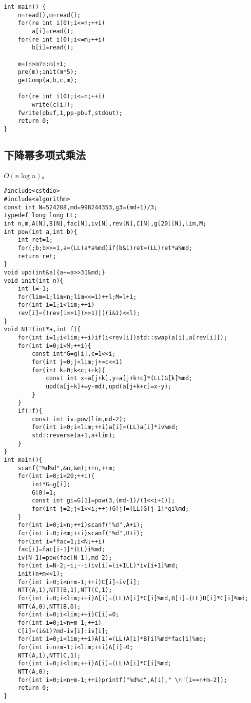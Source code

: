 \documentclass{ctexart}
\begin{document}
\begin{lstlisting}
int main() {
    n=read(),m=read();
    for(re int i(0);i<=n;++i)
        a[i]=read();
    for(re int i(0);i<=m;++i)
        b[i]=read();
    
    m=(n>m?n:m)+1;
    pre(m);init(m*5);
    getComp(a,b,c,m);
    
    for(re int i(0);i<=n;++i)
        write(c[i]);
    fwrite(pbuf,1,pp-pbuf,stdout);
    return 0;
}
\end{lstlisting}

\subsection{下降幂多项式乘法}

$O(n\log n)$。

\begin{lstlisting}
#include<cstdio>
#include<algorithm>
const int N=524288,md=998244353,g3=(md+1)/3;
typedef long long LL;
int n,m,A[N],B[N],fac[N],iv[N],rev[N],C[N],g[20][N],lim,M;
int pow(int a,int b){
    int ret=1;
    for(;b;b>>=1,a=(LL)a*a%md)if(b&1)ret=(LL)ret*a%md;
    return ret;
}
void upd(int&a){a+=a>>31&md;}
void init(int n){
    int l=-1;
    for(lim=1;lim<n;lim<<=1)++l;M=l+1;
    for(int i=1;i<lim;++i)
    rev[i]=((rev[i>>1])>>1)|((i&1)<<l);
}
void NTT(int*a,int f){
    for(int i=1;i<lim;++i)if(i<rev[i])std::swap(a[i],a[rev[i]]);
    for(int i=0;i<M;++i){
        const int*G=g[i],c=1<<i;
        for(int j=0;j<lim;j+=c<<1)
        for(int k=0;k<c;++k){
            const int x=a[j+k],y=a[j+k+c]*(LL)G[k]%md;
            upd(a[j+k]+=y-md),upd(a[j+k+c]=x-y);
        }
    }
    if(!f){
        const int iv=pow(lim,md-2);
        for(int i=0;i<lim;++i)a[i]=(LL)a[i]*iv%md;
        std::reverse(a+1,a+lim);
    }
}
int main(){
    scanf("%d%d",&n,&m);++n,++m;
    for(int i=0;i<20;++i){
        int*G=g[i];
        G[0]=1;
        const int gi=G[1]=pow(3,(md-1)/(1<<i+1));
        for(int j=2;j<1<<i;++j)G[j]=(LL)G[j-1]*gi%md;
    }
    for(int i=0;i<n;++i)scanf("%d",A+i);
    for(int i=0;i<m;++i)scanf("%d",B+i);
    for(int i=*fac=1;i<N;++i)
    fac[i]=fac[i-1]*(LL)i%md;
    iv[N-1]=pow(fac[N-1],md-2);
    for(int i=N-2;~i;--i)iv[i]=(i+1LL)*iv[i+1]%md;
    init(n+m<<1);
    for(int i=0;i<n+m-1;++i)C[i]=iv[i];
    NTT(A,1),NTT(B,1),NTT(C,1);
    for(int i=0;i<lim;++i)A[i]=(LL)A[i]*C[i]%md,B[i]=(LL)B[i]*C[i]%md;
    NTT(A,0),NTT(B,0);
    for(int i=0;i<lim;++i)C[i]=0;
    for(int i=0;i<n+m-1;++i)
    C[i]=(i&1)?md-iv[i]:iv[i];
    for(int i=0;i<lim;++i)A[i]=(LL)A[i]*B[i]%md*fac[i]%md;
    for(int i=n+m-1;i<lim;++i)A[i]=0;
    NTT(A,1),NTT(C,1);
    for(int i=0;i<lim;++i)A[i]=(LL)A[i]*C[i]%md;
    NTT(A,0);
    for(int i=0;i<n+m-1;++i)printf("%d%c",A[i]," \n"[i==n+m-2]);
    return 0;
}
\end{lstlisting}
\end{document}

